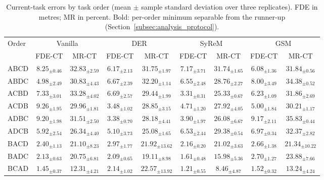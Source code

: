 \begin{table}[!t]
\centering
\caption{Current-task errors by task order (mean $\pm$ sample standard deviation over three replicates). FDE in metres; MR in percent. Bold: per-order minimum separable from the runner-up (Section~\ref{subsec:analysis_protocol}).}
\label{tab:main_results_plasticity}
\setlength{\tabcolsep}{3.5pt}
\renewcommand{\arraystretch}{1.0}
\fontsize{7}{7.7}\selectfont
\begin{tabular*}{\textwidth}{@{\extracolsep{\fill}}lcccccccc}
\toprule
Order & \multicolumn{2}{c}{Vanilla} & \multicolumn{2}{c}{DER} & \multicolumn{2}{c}{SyReM} & \multicolumn{2}{c}{GSM} \\
\cmidrule(lr){2-3}\cmidrule(lr){4-5}\cmidrule(lr){6-7}\cmidrule(lr){8-9}
 & FDE-CT & MR-CT & FDE-CT & MR-CT & FDE-CT & MR-CT & FDE-CT & MR-CT \\
\midrule
ABCD & $8.25_{\pm0.46}$ & $32.83_{\pm2.59}$ & $6.17_{\pm2.13}$ & $31.75_{\pm1.97}$ & $7.17_{\pm3.71}$ & $31.74_{\pm1.65}$ & $6.08_{\pm1.36}$ & $31.84_{\pm0.56}$ \\
ABDC & $4.98_{\pm2.49}$ & $30.83_{\pm4.43}$ & $6.67_{\pm2.39}$ & $32.20_{\pm1.14}$ & $6.55_{\pm2.48}$ & $28.76_{\pm2.27}$ & $8.00_{\pm3.49}$ & $34.38_{\pm0.52}$ \\
ACBD & $7.33_{\pm3.01}$ & $33.28_{\pm4.02}$ & $6.69_{\pm2.57}$ & $29.44_{\pm1.99}$ & {\boldmath$3.31_{\pm0.31}$} & {\boldmath$25.33_{\pm0.67}$} & $6.23_{\pm1.09}$ & $31.86_{\pm2.69}$ \\
ACDB & $9.26_{\pm1.95}$ & $29.96_{\pm1.81}$ & {\boldmath$3.48_{\pm1.02}$} & $28.85_{\pm3.15}$ & $4.71_{\pm1.20}$ & $27.92_{\pm4.05}$ & $5.00_{\pm1.84}$ & $30.21_{\pm1.17}$ \\
ADBC & $9.20_{\pm1.98}$ & $31.51_{\pm2.50}$ & $3.38_{\pm0.70}$ & $28.18_{\pm4.41}$ & $3.90_{\pm1.97}$ & $26.08_{\pm6.67}$ & $9.17_{\pm2.11}$ & $35.83_{\pm0.44}$ \\
ADCB & $5.92_{\pm2.54}$ & $26.34_{\pm4.40}$ & $5.10_{\pm3.73}$ & $25.08_{\pm1.65}$ & $6.53_{\pm2.44}$ & $29.38_{\pm0.54}$ & $6.97_{\pm0.34}$ & $32.37_{\pm2.82}$ \\
BACD & $2.40_{\pm1.13}$ & $21.10_{\pm8.23}$ & $2.97_{\pm1.77}$ & $21.92_{\pm13.62}$ & $2.16_{\pm0.20}$ & $21.02_{\pm3.63}$ & $2.66_{\pm1.38}$ & $21.34_{\pm10.22}$ \\
BADC & $2.13_{\pm0.63}$ & $20.75_{\pm6.81}$ & $2.09_{\pm0.65}$ & $19.11_{\pm8.98}$ & $1.61_{\pm0.48}$ & $15.98_{\pm5.36}$ & $2.70_{\pm1.27}$ & $23.88_{\pm7.66}$ \\
BCAD & $1.45_{\pm0.37}$ & $12.31_{\pm4.21}$ & $2.14_{\pm1.02}$ & $22.57_{\pm13.92}$ & $1.21_{\pm0.55}$ & $8.46_{\pm4.87}$ & $1.52_{\pm0.32}$ & $13.24_{\pm4.24}$ \\

\end{tabular*}
\end{table}
